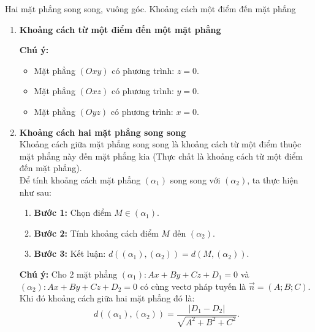 \begin{dang}{Hai mặt phẳng song song, vuông góc. Khoảng cách một điểm đến mặt phẳng}
\begin{enumerate}[label=\bf\arabic*.]
		\item \textbf{Khoảng cách từ một điểm đến một mặt phẳng}
		\begin{note}
			\textbf{Chú ý:}
			\begin{itemize}
				\item Mặt phẳng $(O x y)$ có phương trình: $z=0$.
				\item Mặt phẳng $(O x z)$ có phương trình: $y=0$.
				\item Mặt phẳng $(O y z)$ có phương trình: $x=0$.
			\end{itemize}
		\end{note}
		\item \textbf{Khoảng cách hai mặt phẳng song song}\\
		Khoảng cách giữa mặt phẳng song song là khoảng cách từ một điểm thuộc mặt phẳng này đến mặt phẳng kia (Thực chất là khoảng cách từ một điểm đến mặt phẳng).\\
		Để tính khoảng cách mặt phẳng $\left(\alpha_1\right)$ song song với $\left(\alpha_2\right)$, ta thực hiện như sau:
		\begin{enumerate}
			\item[] \textbf{Bước 1:} Chọn điểm $M \in\left(\alpha_1\right)$.
			\item[] \textbf{Bước 2:} Tính khoảng cách điểm $M$ đến $\left(\alpha_2\right)$.
			\item[] \textbf{Bước 3:} Kết luận: $d\left(\left(\alpha_1\right),\left(\alpha_2\right)\right)=d\left(M,\left(\alpha_2\right)\right)$.
		\end{enumerate}
		\begin{note}
			\textbf{Chú ý:}
			Cho 2 mặt phẳng $\left(\alpha_1\right)\colon A x+B y+C z+D_1=0$ và $\left(\alpha_2\right)\colon A x+B y+C z+D_2=0$ có cùng vectơ pháp tuyến là $\overrightarrow{n}=(A; B; C)$. Khi đó khoảng cách giữa hai mặt phẳng đó là: $$d\left(\left(\alpha_1\right),(\alpha_2)\right)=\dfrac{\left|D_1-D_2\right|}{\sqrt{A^2+B^2+C^2}}.$$ 
		\end{note}
	\end{enumerate}
\end{dang}

